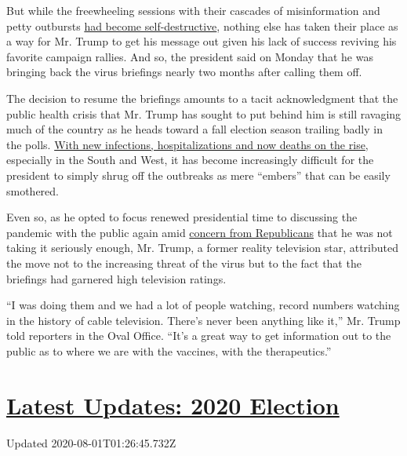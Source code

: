 But while the freewheeling sessions with their cascades of
misinformation and petty outbursts
\href{https://www.nytimes.com/2020/04/09/us/politics/trump-coronavirus-press-briefing.html}{had
become self-destructive}, nothing else has taken their place as a way
for Mr. Trump to get his message out given his lack of success reviving
his favorite campaign rallies. And so, the president said on Monday that
he was bringing back the virus briefings nearly two months after calling
them off.

The decision to resume the briefings amounts to a tacit acknowledgment
that the public health crisis that Mr. Trump has sought to put behind
him is still ravaging much of the country as he heads toward a fall
election season trailing badly in the polls.
\href{https://www.nytimes.com/interactive/2020/us/coronavirus-us-cases.html}{With
new infections, hospitalizations and now deaths on the rise}, especially
in the South and West, it has become increasingly difficult for the
president to simply shrug off the outbreaks as mere ``embers'' that can
be easily smothered.

Even so, as he opted to focus renewed presidential time to discussing
the pandemic with the public again amid
\href{https://www.nytimes.com/2020/07/19/us/politics/republicans-contradict-trump-coronavirus.html}{concern
from Republicans} that he was not taking it seriously enough, Mr. Trump,
a former reality television star, attributed the move not to the
increasing threat of the virus but to the fact that the briefings had
garnered high television ratings.

``I was doing them and we had a lot of people watching, record numbers
watching in the history of cable television. There's never been anything
like it,'' Mr. Trump told reporters in the Oval Office. ``It's a great
way to get information out to the public as to where we are with the
vaccines, with the therapeutics.''

\hypertarget{latest-updates-2020-election}{%
\section{\texorpdfstring{\href{https://www.nytimes.com/2020/07/31/us/elections/biden-vs-trump.html?action=click\&pgtype=Article\&state=default\&region=MAIN_CONTENT_1\&context=storylines_live_updates}{Latest
Updates: 2020
Election}}{Latest Updates: 2020 Election}}\label{latest-updates-2020-election}}

Updated 2020-08-01T01:26:45.732Z

